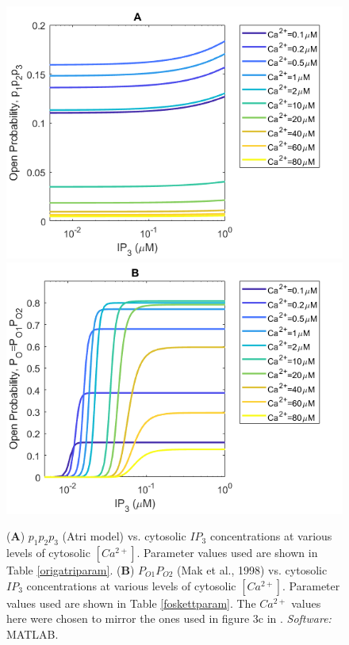 \begin{figure}[h!!!t!!!b!!!p]
\centering
  \includegraphics[width=\linewidth]{Chapters/5_New_Model/extras/fig3cfoskettmatlabATRI.png}
\endminipage\hfill
{}
  \includegraphics[width=\linewidth]{Chapters/5_New_Model/extras/anotherfoskettfig3c.png}
\endminipage\hfill
  \caption{(\textbf{A}) $p_1p_2p_3$ (Atri model) vs. cytosolic $IP_3$ concentrations at various levels of cytosolic $[Ca^{2+}]$. Parameter values used are shown in Table \ref{origatriparam}. (\textbf{B}) $P_{O1}P_{O2}$ (Mak et al., 1998) vs. cytosolic $IP_3$ concentrations at various levels of cytosolic $[Ca^{2+}]$. Parameter values used are shown in Table \ref{foskettparam}. {The $Ca^{2+}$ values here were chosen to mirror the ones used in figure 3c in .} \textit{Software:} MATLAB. }\label{fig3datrifoskett}
\end{figure}

